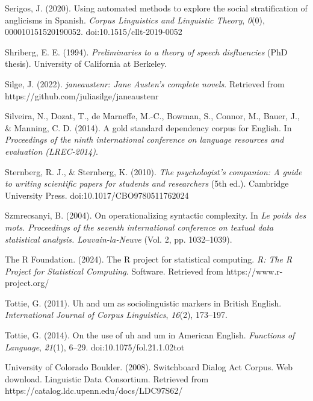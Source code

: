 \documentclass[
  letterpaper,
  krantz1]{latex/krantz-mod}
\newlength{\cslhangindent}
\newenvironment{CSLReferences}[2] %
 {\begin{list}{}{%
  \setlength{\itemindent}{0pt}
  \setlength{\leftmargin}{0pt}
  \setlength{\parsep}{0pt}
  \ifodd #1
   \setlength{\leftmargin}{\cslhangindent}
   \setlength{\itemindent}{-1\cslhangindent}
  \fi
  \setlength{\itemsep}{#2\baselineskip}}}
 {\end{list}}
\theoremstyle{definition}
\theoremstyle{definition}
\theoremstyle{remark}
\begin{document}
\begin{CSLReferences}{1}{0}
Serigos, J. (2020). Using automated methods to explore the social
stratification of anglicisms in {Spanish}. \emph{Corpus Linguistics and
Linguistic Theory}, \emph{0}(0), 000010151520190052.
doi:10.1515/cllt-2019-0052

Shriberg, E. E. (1994). \emph{Preliminaries to a theory of speech
disfluencies} (PhD thesis). University of California at Berkeley.

Silge, J. (2022). \emph{{janeaustenr}: Jane {A}usten's complete novels}.
Retrieved from https://github.com/juliasilge/janeaustenr

Silveira, N., Dozat, T., de Marneffe, M.-C., Bowman, S., Connor, M.,
Bauer, J., \& Manning, C. D. (2014). A gold standard dependency corpus
for {English}. In \emph{Proceedings of the ninth international
conference on language resources and evaluation ({LREC-2014})}.

Sternberg, R. J., \& Sternberg, K. (2010). \emph{The psychologist's
companion: A guide to writing scientific papers for students and
researchers} (5th ed.). Cambridge University Press.
doi:10.1017/CBO9780511762024

Szmrecsanyi, B. (2004). On operationalizing syntactic complexity. In
\emph{Le poids des mots. {Proceedings} of the seventh international
conference on textual data statistical analysis. {Louvain-la-Neuve}}
(Vol. 2, pp. 1032--1039).

The R Foundation. (2024). The {R} project for statistical computing.
\emph{R: The R Project for Statistical Computing}. Software. Retrieved
from https://www.r-project.org/

Tottie, G. (2011). Uh and um as sociolinguistic markers in {British
English}. \emph{International Journal of Corpus Linguistics},
\emph{16}(2), 173--197.

Tottie, G. (2014). On the use of uh and um in {American English}.
\emph{Functions of Language}, \emph{21}(1), 6--29.
doi:10.1075/fol.21.1.02tot

University of Colorado Boulder. (2008). Switchboard {Dialog Act Corpus}.
{Web} download. Linguistic Data Consortium. Retrieved from
https://catalog.ldc.upenn.edu/docs/LDC97S62/


\end{CSLReferences}
\end{document}

